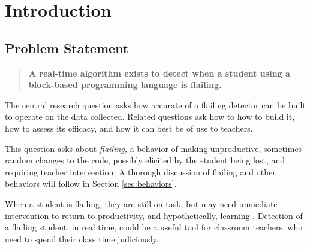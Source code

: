 \chapter{Introduction}

 
\section{Problem Statement} \label{sec:problem-statement}
\begin{quote}
\textbf{A real-time algorithm exists to detect when a student using a block-based programming language is flailing.}
\end{quote}

The central research question asks how accurate of a flailing detector can be built to operate on the data collected. Related questions ask how to how to build it, how to assess its efficacy, and how it can best be of use to teachers.

This question asks about \emph{flailing,} a behavior of making unproductive, sometimes random changes to the code, possibly elicited by the student being lost, and requiring teacher intervention. A thorough discussion of flailing and other behaviors will follow in Section \ref{sec:behaviors}.

When a student is flailing, they are still on-task, but may need immediate intervention to return to productivity, and hypothetically, learning \citep{baker2004off, perkins-1986}. Detection of a flailing student, in real time, could be a useful tool for classroom teachers, who need to spend their class time judiciously. %




